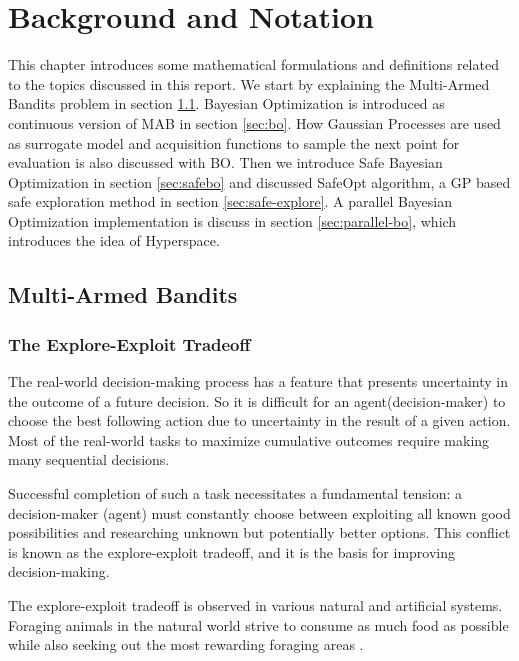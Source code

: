 \chapter{Background and Notation}\label{ch:background}

This chapter introduces some mathematical formulations and definitions related to the topics discussed in this report. We start by explaining the Multi-Armed Bandits problem in section \ref{sec:mab}. 
Bayesian Optimization is introduced as continuous version of MAB in section \ref{sec:bo}. How Gaussian Processes are used as surrogate model and acquisition functions to sample the next point for evaluation is also discussed with BO. 
Then we introduce Safe Bayesian Optimization in section \ref{sec:safebo} and discussed SafeOpt algorithm, a GP based safe exploration method in section \ref{sec:safe-explore}.
A parallel Bayesian Optimization implementation is discuss in section \ref{sec:parallel-bo}, which introduces the idea of Hyperspace.

\section{Multi-Armed Bandits}\label{sec:mab}
\subsection{The Explore-Exploit Tradeoff}
The real-world decision-making process has a feature that presents uncertainty in the outcome of a future decision. So it is difficult for an agent(decision-maker) to choose the best following action due to uncertainty in the result of a given action. Most of the real-world tasks to maximize cumulative outcomes require making many sequential decisions.

Successful completion of such a task necessitates a fundamental tension: a decision-maker (agent) must constantly choose between exploiting all known good possibilities and researching unknown but potentially better options. This conflict is known as the explore-exploit tradeoff, and it is the basis for improving decision-making.

The explore-exploit tradeoff is observed in various natural and artificial systems. Foraging animals in the natural world strive to consume as much food as possible while also seeking out the most rewarding foraging areas \cite{Keasar:2002}.

